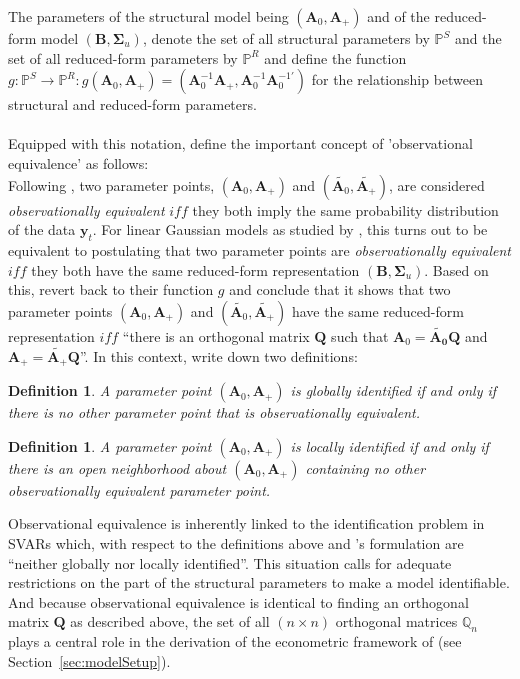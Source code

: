 \documentclass[a4paper,11pt,listof=nochaptergap,oneside,pointednumbers,bibtotoc,bigheadings,liststotoc]{scrbook}
\theoremstyle{mysatz}
\theoremstyle{mydefinition}
\newtheorem{defi}[satz]{Definition}
\theoremstyle{mytheorem}
\theoremstyle{mybemerkung}
\newcommand{\vect}[1]{\boldsymbol{\mathbf{#1}}}
\begin{document}
The parameters of the structural model being $(\vect{A}_0, \vect{A}_+)$ and of the reduced-form model $(\vect{B}, \vect{\Sigma}_u)$, \citet{rubioetal:10} denote the set of all structural parameters by $\mathbb{P}^S$ and the set of all reduced-form parameters by $\mathbb{P}^R$ and define the function $g: \mathbb{P}^S \to \mathbb{P}^R: g(\vect{A}_0, \vect{A}_+) = (\vect{A}_0^{-1}\vect{A}_+, \vect{A}_0^{-1}\vect{A}_0^{-1'})$ for the relationship between structural and reduced-form parameters.\\
\\
Equipped with this notation, \citet{rubioetal:10} define the important concept of 'observational equivalence' as follows: \\
Following \citet{rothenberg:71}, two parameter points, $(\vect{A}_0, \vect{A}_+)$ and $(\widetilde{\vect{A}_0}, \widetilde{\vect{A}_+})$, are considered \textit{observationally equivalent} $iff$ they both imply the same probability distribution of the data $\vect{y}_t$. For linear Gaussian models as studied by \citet{rubioetal:10}, this turns out to be equivalent to postulating that two parameter points are \textit{observationally equivalent} $iff$ they both have the same reduced-form representation $(\vect{B}, \vect{\Sigma}_u)$. Based on this, \citet{rubioetal:10} revert back to their function $g$ and conclude that it shows that two parameter points $(\vect{A}_0, \vect{A}_+)$ and $(\widetilde{\vect{A}_0}, \widetilde{\vect{A}_+})$ have the same reduced-form representation $iff$ ``there is an orthogonal matrix $\vect{Q}$ such that $\vect{A}_0 = \vect{\widetilde{\vect{A}_0}}\vect{Q}$ and $\vect{A}_+ = \widetilde{\vect{A}_+} \vect{Q}$''. In this context, \citet{rubioetal:10} write down two definitions:
\begin{defi}
A parameter point $(\vect{A}_0, \vect{A}_+)$ is globally identified if and only if there is no other parameter point that is observationally equivalent.
\end{defi}
\begin{defi}
A parameter point $(\vect{A}_0, \vect{A}_+)$ is locally identified if and only if there is an open neighborhood about $(\vect{A}_0, \vect{A}_+)$ containing no other observationally equivalent parameter point.
\end{defi}

Observational equivalence is inherently linked to the identification problem in SVARs which, with respect to the definitions above and \citet{rubioetal:10}'s formulation are ``neither globally nor locally identified''. This situation calls for adequate restrictions on the part of the structural parameters to make a model identifiable. And because observational equivalence is identical to finding an orthogonal matrix $\vect{Q}$ as described above, the set of all $(n \times n)$ orthogonal matrices $\mathbb{Q}_n$ plays a central role in the derivation of the econometric framework of \citet{ludvigsonetal:18} (see Section~\ref{sec:modelSetup}).
	
\end{document}

